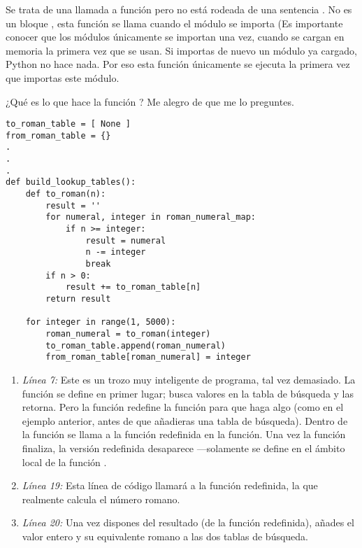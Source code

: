 Se trata de una llamada a función pero no está rodeada de una sentencia . No es un bloque , esta función se llama cuando el módulo se importa (Es importante conocer que los módulos únicamente se importan una vez, cuando se cargan en memoria la primera vez que se usan. Si importas de nuevo un módulo ya cargado, Python no hace nada. Por eso esta función únicamente se ejecuta la primera vez que importas este módulo.

¿Qué es lo que hace la función ? Me alegro de que me lo preguntes.

\noindent\begin{minipage}{\textwidth}
\begin{lstlisting}[mathescape=True]
to_roman_table = [ None ]
from_roman_table = {}
.
.
.
def build_lookup_tables():
    def to_roman(n):
        result = ''
        for numeral, integer in roman_numeral_map:
            if n >= integer:
                result = numeral
                n -= integer
                break
        if n > 0:
            result += to_roman_table[n]
        return result

    for integer in range(1, 5000):
        roman_numeral = to_roman(integer)
        to_roman_table.append(roman_numeral)
        from_roman_table[roman_numeral] = integer
\end{lstlisting}
\end{minipage}

\begin{enumerate}

\item \emph{Línea 7:} Este es un trozo muy inteligente de programa, tal vez demasiado. La función  se define en primer lugar; busca valores en la tabla de búsqueda y las retorna. Pero la función  redefine la función para que haga algo (como en el ejemplo anterior, antes de que añadieras una tabla de búsqueda). Dentro de la función  se llama a la función  redefinida en la función. Una vez la función  finaliza, la versión redefinida desaparece ---solamente se define en el ámbito local de la función .

\item \emph{Línea 19:} Esta línea de código llamará a la función  redefinida, la que realmente calcula el número romano.

\item \emph{Línea 20:} Una vez dispones del resultado (de la función  redefinida), añades el valor entero y su equivalente romano a las dos tablas de búsqueda.

\end{enumerate}

